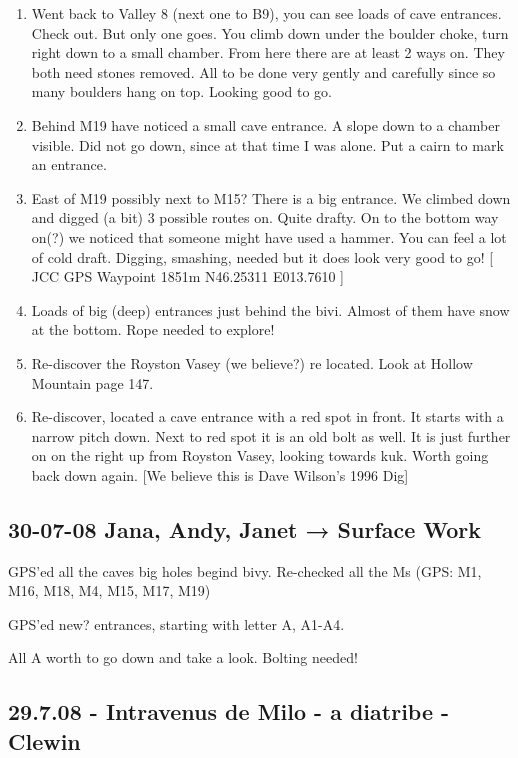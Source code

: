 \begin{enumerate}
\def\labelenumi{\arabic{enumi})}
\item
  Went back to Valley 8 (next one to B9), you can see loads of cave
  entrances. Check out. But only one goes. You climb down under the
  boulder choke, turn right down to a small chamber. From here there are
  at least 2 ways on. They both need stones removed. All to be done very
  gently and carefully since so many boulders hang on top. Looking good
  to go.
\item
  Behind M19 have noticed a small cave entrance. A slope down to a
  chamber visible. Did not go down, since at that time I was alone. Put
  a cairn to mark an entrance.
\item
  East of M19 possibly next to M15? There is a big entrance. We climbed
  down and digged (a bit) 3 possible routes on. Quite drafty. On to the
  bottom way on(?) we noticed that someone might have used a hammer. You
  can feel a lot of cold draft. Digging, smashing, needed but it does
  look very good to go! {[} JCC GPS Waypoint 1851m N46.25311 E013.7610
  {]}
\item
  Loads of big (deep) entrances just behind the bivi. Almost of them
  have snow at the bottom. Rope needed to explore!
\item
  Re-discover the Royston Vasey (we believe?) re located. Look at Hollow
  Mountain page 147.
\item
  Re-discover, located a cave entrance with a red spot in front. It
  starts with a narrow pitch down. Next to red spot it is an old bolt as
  well. It is just further on on the right up from Royston Vasey,
  looking towards kuk. Worth going back down again. {[}We believe this
  is Dave Wilson's 1996 Dig{]}
\end{enumerate}


\subsection{30-07-08 Jana, Andy, Janet → Surface
Work}\label{jana-andy-janet-surface-work}

GPS'ed all the caves big holes begind bivy. Re-checked all the Ms (GPS:
M1, M16, M18, M4, M15, M17, M19)

GPS'ed new? entrances, starting with letter A, A1-A4.

All A worth to go down and take a look. Bolting needed! 

\subsection{29.7.08 - Intravenus de Milo - a diatribe -
Clewin}\label{intravenus-de-milo---a-diatribe---clewin}

